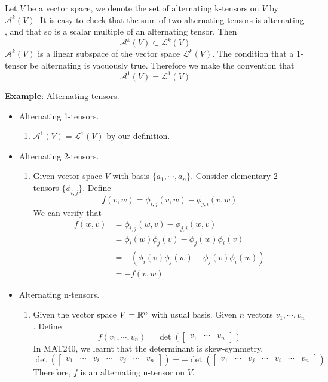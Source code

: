 \begin{definition}
    Let $V$ be a vector space, we denote the set of alternating k-tensors on $V$ by $\mathcal{A}^k(V)$. It is easy to check that the sum of two alternating tensors is alternating , and that so is a scalar multiple of an alternating tensor. 
    Then $$\mathcal{A}^k(V)\subset \mathcal{L}^k(V)$$
    $\mathcal{A}^k(V)$ is a linear subspace of the vector space $\mathcal{L}^k(V)$. 
    The condition that a 1-tensor be alternating is vacuously true. Therefore we make the convention that $$\mathcal{A}^1(V)=\mathcal{L}^1(V)$$
\end{definition}

\noindent\textbf{Example}: Alternating tensors.
\begin{itemize}
    \item Alternating 1-tensors.
    \begin{enumerate}
        \item $\mathcal{A}^1(V)=\mathcal{L}^1(V)$ by our definition.
    \end{enumerate}
    \item Alternating 2-tensors.
    \begin{enumerate}
        \item Given vector space $V$ with basis $\{a_1,\cdots,a_n\}$. Consider elementary 2-tensors $\{\phi_{i,j}\}$. Define 
        $$f(v,w)=\phi_{i,j}(v,w)-\phi_{j,i}(v,w)$$
        We can verify that 
        \begin{equation*}
            \begin{split}
                f(w,v) &= \phi_{i,j}(w,v)-\phi_{j,i}(w,v)\\
                &= \phi_i(w)\phi_j(v)-\phi_j(w)\phi_i(v)\\
                &= -(\phi_i(v)\phi_j(w)-\phi_j(v)\phi_i(w))\\
                &= -f(v,w)
            \end{split}
        \end{equation*}
    \end{enumerate}
    \item Alternating n-tensors.
    \begin{enumerate}
        \item Given the vector space $V=\mathbb{R}^n$ with usual basis. Given $n$ vectors $v_1,\cdots,v_n$. Define
        $$f(v_1,\cdots,v_n)=\det(\begin{bmatrix}
            v_1 & \cdots & v_n
        \end{bmatrix})$$
        In MAT240, we learnt that the determinant is skew-symmetry. 
        $$\det(\begin{bmatrix}
            v_1 & \cdots & v_i & \cdots & v_j & \cdots & v_n
        \end{bmatrix})=-\det(\begin{bmatrix}
            v_1 & \cdots & v_j & \cdots & v_i & \cdots & v_n
        \end{bmatrix})$$
        Therefore, $f$ is an alternating n-tensor on $V$.
    \end{enumerate}
\end{itemize}

